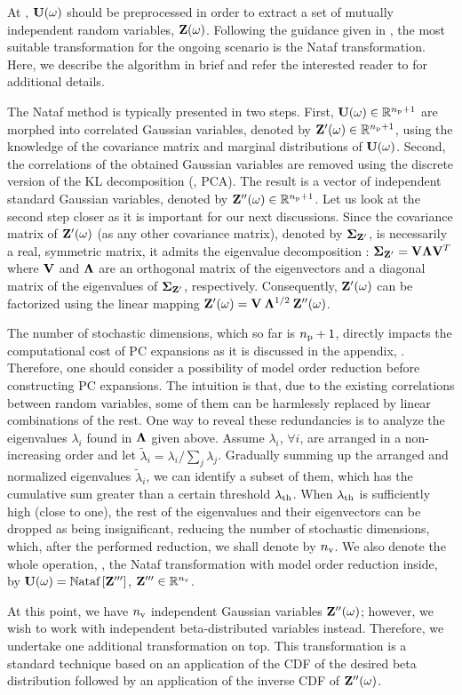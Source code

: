 At , $\mathbf{U}(\omega)$ should be preprocessed in order to extract a set of mutually independent random variables, $\mathbf{Z}(\omega)$.
Following the guidance given in , the most suitable transformation for the ongoing scenario is the Nataf transformation.
Here, we describe the algorithm in brief and refer the interested reader to \cite{li2008} for additional details.

The Nataf method is typically presented in two steps.
First, $\mathbf{U}(\omega) \in \mathbb{R}^{{n_\text{p}} + 1}$ are morphed into correlated Gaussian variables, denoted by $\mathbf{Z}'(\omega) \in \mathbb{R}^{{n_\text{p}} + 1}$, using the knowledge of the covariance matrix and marginal distributions of $\mathbf{U}(\omega)$.
Second, the correlations of the obtained Gaussian variables are removed using the discrete version of the KL decomposition (\ie, PCA).
The result is a vector of independent standard Gaussian variables, denoted by $\mathbf{Z}''(\omega) \in \mathbb{R}^{{n_\text{p}} + 1}$.
Let us look at the second step closer as it is important for our next discussions.
Since the covariance matrix of $\mathbf{Z}'(\omega)$ (as any other covariance matrix), denoted by $\mCov_{\vZ'}$, is necessarily a real, symmetric matrix, it admits the eigenvalue decomposition \cite{press2007}: $\mCov_{\vZ'} = \m{V} \m{\Lambda} \m{V}^T$ where $\m{V}$ and $\m{\Lambda}$ are an orthogonal matrix of the eigenvectors and a diagonal matrix of the eigenvalues of $\mCov_{\vZ'}$, respectively.
Consequently, $\mathbf{Z}'(\omega)$ can be factorized using the linear mapping $\vZ'(\o) = \m{V} \: \m{\Lambda}^{1/2} \: \vZ''(\o)$.

The number of stochastic dimensions, which so far is ${n_\text{p}} + 1$, directly impacts the computational cost of PC expansions as it is discussed in the appendix, .
Therefore, one should consider a possibility of model order reduction before constructing PC expansions.
The intuition is that, due to the existing correlations between random variables, some of them can be harmlessly replaced by linear combinations of the rest.
One way to reveal these redundancies is to analyze the eigenvalues $\lambda_i$ found in $\m{\Lambda}$ given above.
Assume $\lambda_i$, $\forall i$, are arranged in a non-increasing order and let $\tilde{\lambda}_i = \lambda_i / \sum_j \lambda_j$.
Gradually summing up the arranged and normalized eigenvalues $\tilde{\lambda}_i$, we can identify a subset of them, which has the cumulative sum greater than a certain threshold $\lambda_\text{th}$.
When $\lambda_\text{th}$ is sufficiently high (close to one), the rest of the eigenvalues and their eigenvectors can be dropped as being insignificant, reducing the number of stochastic dimensions, which, after the performed reduction, we shall denote by ${n_\text{v}}$.
We also denote the whole operation, \ie, the Nataf transformation with model order reduction inside, by $\mathbf{U}(\omega) = \mathbb{N}\text{ataf}\left[\mathbf{Z}'''\right]$, $\mathbf{Z}''' \in \mathbb{R}^{n_\text{v}}$.

At this point, we have ${n_\text{v}}$ independent Gaussian variables $\mathbf{Z}''(\omega)$; however, we wish to work with independent beta-distributed variables instead.
Therefore, we undertake one additional transformation on top.
This transformation is a standard technique \cite{durrett2010} based on an application of the CDF of the desired beta distribution followed by an application of the inverse CDF of $\mathbf{Z}''(\omega)$.
